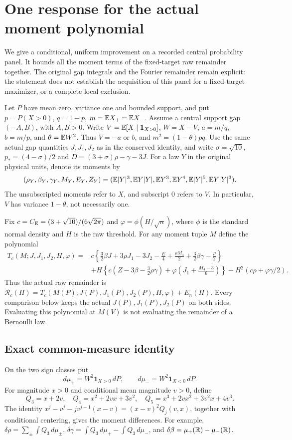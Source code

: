 \section{One response for the actual moment polynomial}

We give a conditional, uniform improvement on a recorded central probability
panel. It bounds all the moment terms of the fixed-target raw remainder
together. The original gap integrals and the Fourier remainder remain
explicit: the statement does not establish the acquisition of this panel
for a fixed-target maximizer, or a complete local exclusion.

Let $P$ have mean zero, variance one and bounded support, and put
$p=P(X>0)$, $q=1-p$, $m=\mathbb E X_+=\mathbb E X_-$.
Assume a central support gap $(-A,B)$, with $A,B>0$.
Write $V=\mathbb E[X\mid\mathbf1_{X>0}]$, $W=X-V$,
$a=m/q$, $b=m/p$, and $\theta=\mathbb E W^2$.
Thus $V=-a$ or $b$, and $m^2=(1-\theta)pq$.
Use the same actual gap quantities $J,J_1,J_2$ as in the conserved identity,
and write $\sigma=\sqrt{10}$, $p_*=(4-\sigma)/2$ and
$D=(3+\sigma)\rho-\gamma-3J$.
For a law $Y$ in the original physical units, denote its moments by
\[
 (\rho_Y,\beta_Y,\gamma_Y,M_Y,E_Y,Z_Y)
 =(\mathbb E|Y|^3,\mathbb E Y|Y|,\mathbb E Y^3,\mathbb E Y^4,\mathbb E|Y|^5,\mathbb E Y|Y|^3).
\]
The unsubscripted moments refer to $X$, and subscript $0$ refers to $V$.
In particular, $V$ has variance $1-\theta$, not necessarily one.

Fix $c=C_{\mathrm E}=(3+\sqrt{10})/(6\sqrt{2\pi})$ and
$\varphi=\phi(H/\sqrt n)$, where $\phi$ is the standard normal density
and $H$ is the raw threshold.
For any moment tuple $M$ define the polynomial
\begin{align*}
 T_c(M;J,J_1,J_2,H,\varphi)
 ={}&c\left\{\frac32\beta J+3\rho J_1-3J_2
 -\frac{E}{4}+\frac{\rho M_4}{2}+\frac32\beta\gamma-\frac\rho2\right\}\\
 &+H\left\{c\left(Z-3\beta-\frac32\rho\gamma\right)
                  +\varphi\left(J_1+\frac{M_4-3}{6}\right)\right\}
 -H^2(c\rho+\varphi\gamma/2).
\end{align*}
Thus the actual raw remainder is $\mathcal R_c(H)=T_c(M(P);J(P),J_1(P),
J_2(P),H,\varphi)+E_n(H)$.
Every comparison below keeps the actual $J(P),J_1(P),J_2(P)$ on both sides.
Evaluating this polynomial at $M(V)$ is not evaluating the remainder of
a Bernoulli law.

\subsection{Exact common-measure identity}
On the two sign classes put
\[
 d\mu_+=W^2\mathbf1_{X>0}\,dP,\qquad
 d\mu_-=W^2\mathbf1_{X<0}\,dP.
\]
For magnitude $x>0$ and conditional mean magnitude $v>0$, define
\[
 Q_3=x+2v,\quad Q_4=x^2+2vx+3v^2,\quad
 Q_5=x^3+2vx^2+3v^2x+4v^3.
\]
The identity
$x^j-v^j-jv^{j-1}(x-v)=(x-v)^2Q_j(v,x)$,
together with conditional centering, gives the moment differences.
For example, $\delta\rho=\sum_\pm\int Q_3\,d\mu_\pm$,
$\delta\gamma=\int Q_3\,d\mu_+-\int Q_3\,d\mu_-$,
and $\delta\beta=\mu_+(\mathbb R)-\mu_-(\mathbb R)$.

